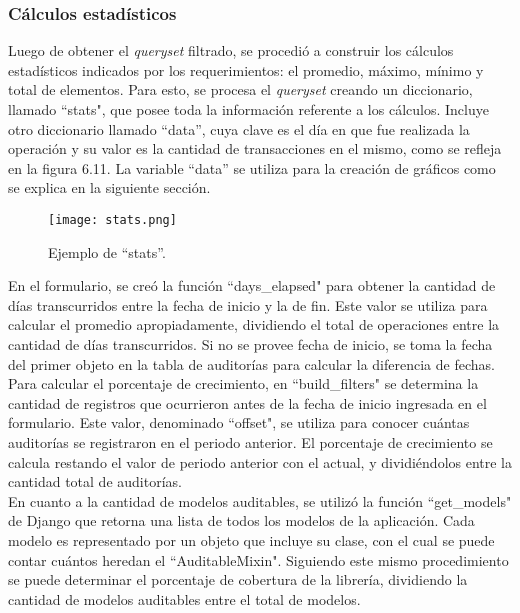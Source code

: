 \subsubsection{Cálculos estadísticos}

Luego de obtener el \textit{queryset} filtrado, se procedió a construir los cálculos estadísticos indicados por los requerimientos: el promedio, máximo, mínimo y total de elementos. Para esto, se procesa el \textit{queryset} creando un diccionario, llamado “stats",  que posee toda la información referente a los cálculos. Incluye otro diccionario llamado “data”, cuya clave es el día en que fue realizada la operación y su valor es la cantidad de transacciones en el mismo, como se refleja en la figura 6.11. La variable “data” se utiliza para la creación de gráficos como se explica en la siguiente sección.\\

\begin{figure}[h]
\centering
\texttt{[image: stats.png]}
\caption{Ejemplo de “stats”.}
\label{fig:figura6.11}
\end{figure}

En el formulario, se creó la función “days\_elapsed" para obtener la cantidad de días transcurridos entre la fecha de inicio y la de fin. Este valor se utiliza para calcular el promedio apropiadamente, dividiendo el total de operaciones entre la cantidad de días transcurridos. Si no se provee fecha de inicio, se toma la fecha del primer objeto en la tabla de auditorías para calcular la diferencia de fechas.\\

Para calcular el porcentaje de crecimiento, en “build\_filters" se determina la cantidad de registros que ocurrieron antes de la fecha de inicio ingresada en el formulario. Este valor, denominado “offset", se utiliza para conocer cuántas auditorías se registraron en el periodo anterior. El porcentaje de crecimiento se calcula restando el valor de periodo anterior con el actual, y dividiéndolos entre la cantidad total de auditorías.\\

En cuanto a la cantidad de modelos auditables, se utilizó la función “get\_models" de Django que retorna una lista de todos los modelos de la aplicación. Cada modelo es representado por un objeto que incluye su clase, con el cual se puede contar cuántos heredan el “AuditableMixin". Siguiendo este mismo procedimiento se puede determinar el porcentaje de cobertura de la librería, dividiendo la cantidad de modelos auditables entre el total de modelos.\\

